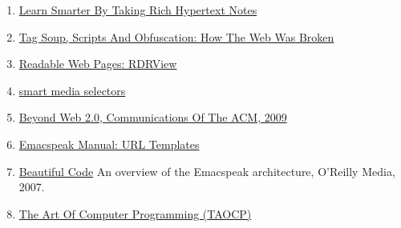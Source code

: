 \documentclass[11pt]{article}
\begin{document}
\begin{enumerate}
\item \href{https://emacspeak.blogspot.com/2022/10/learn-smarter-by-taking-rich-hypertext.html}{Learn Smarter By Taking Rich Hypertext Notes}
\item \href{https://idlewords.com/talks/website\_obesity.htm}{Tag Soup, Scripts And Obfuscation: How The Web Was Broken}
\item \href{https://github.com/eafer/rdrview}{Readable Web Pages: RDRView}
\item \href{https://emacspeak.blogspot.com/2024/03/updated-smart-media-selector-for-audio.html}{smart media selectors}
\item \href{https://emacspeak.sourceforge.net/raman/publications/beyond-web20-cacm-2009/}{Beyond Web 2.0, Communications Of The ACM, 2009}
\item \href{https://tvraman.github.io/emacspeak/manual/URL-Templates.html}{Emacspeak Manual: URL Templates}
\item \href{http://emacspeak.blogspot.com/2007/07/emacspeak-and-beautiful-code.html}{Beautiful Code}   An overview of the Emacspeak architecture, O'Reilly Media, 2007.
\item \href{https://www-cs-faculty.stanford.edu/\~knuth/taocp.html}{The Art Of Computer Programming (TAOCP)}
\end{enumerate}
\end{document}
